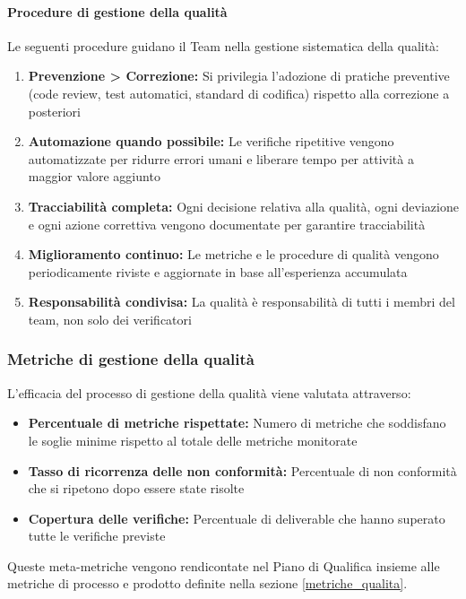 \documentclass[a4paper,12pt]{article}
\begin{document}
\paragraph{Procedure di gestione della qualità}
Le seguenti procedure guidano il Team nella gestione sistematica della qualità:
\begin{enumerate}
    \item \textbf{Prevenzione > Correzione:} Si privilegia l'adozione di pratiche preventive (code review, test automatici, standard di codifica) rispetto alla correzione a posteriori
    \item \textbf{Automazione quando possibile:} Le verifiche ripetitive vengono automatizzate per ridurre errori umani e liberare tempo per attività a maggior valore aggiunto
    \item \textbf{Tracciabilità completa:} Ogni decisione relativa alla qualità, ogni deviazione e ogni azione correttiva vengono documentate per garantire tracciabilità
    \item \textbf{Miglioramento continuo:} Le metriche e le procedure di qualità vengono periodicamente riviste e aggiornate in base all'esperienza accumulata
    \item \textbf{Responsabilità condivisa:} La qualità è responsabilità di tutti i membri del team, non solo dei verificatori
\end{enumerate}

\subsubsection{Metriche di gestione della qualità}\label{metriche_gestione_qualita}
L'efficacia del processo di gestione della qualità viene valutata attraverso:
\begin{itemize}
    \item \textbf{Percentuale di metriche rispettate:} Numero di metriche che soddisfano le soglie minime rispetto al totale delle metriche monitorate
    \item \textbf{Tasso di ricorrenza delle non conformità:} Percentuale di non conformità che si ripetono dopo essere state risolte
    \item \textbf{Copertura delle verifiche:} Percentuale di deliverable che hanno superato tutte le verifiche previste
\end{itemize}

Queste meta-metriche vengono rendicontate nel Piano di Qualifica insieme alle metriche di processo e prodotto definite nella sezione \ref{metriche_qualita}.
\end{document}

